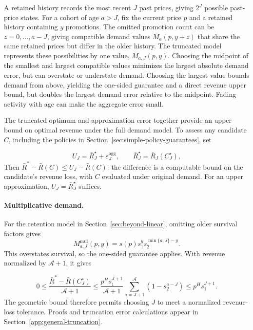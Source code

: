 \begingroup\color{black}
A retained history records the most recent \(J\) past prices, giving \(2^J\) possible past-price states. For a cohort of age \(a>J\), fix the current price \(p\) and a retained history containing \(y\) promotions. The omitted promotion count can be \(z=0,\ldots,a-J\), giving compatible demand values \(M_a(p,y+z)\) that share the same retained prices but differ in the older history. The truncated model represents these possibilities by one value, \(M_{a,J}(p,y)\). Choosing the midpoint of the smallest and largest compatible values minimizes the largest absolute demand error, but can overstate or understate demand. Choosing the largest value bounds demand from above, yielding the one-sided guarantee and a direct revenue upper bound, but doubles the largest demand error relative to the midpoint. Fading activity with age can make the aggregate error small.
\par\endgroup

\begingroup\color{black}
The truncated optimum and approximation error together provide an upper bound on optimal revenue under the full demand model. To assess any candidate \(C\), including the policies in Section~\ref{sec:simple-policy-guarantees}, set
\par\endgroup
\[
 U_J=\bar R_J^\star+\varepsilon_J^{\mathrm{agg}},
 \qquad \bar R_J^\star=\bar R_J(C_J^\star),
\]
\begingroup\color{black}
Then \(\bar R^*-\bar R(C)\le U_J-\bar R(C)\): the difference is a computable bound on the candidate's revenue loss, with \(C\) evaluated under original demand. For an upper approximation, \(U_J=\bar R_J^\star\) suffices.
\par\endgroup

\paragraph{Multiplicative demand.}
For the retention model in Section~\ref{sec:beyond-linear}, omitting older survival factors gives
\[
 M_{a,J}^{\mathrm{mul}}(p,y)
 =s(p)s_1^ys_2^{\min\{a,J\}-y}.
\]
\begingroup\color{black}
This overstates survival, so the one-sided guarantee applies. With revenue normalized by \(\mathcal A+1\), it gives
\par\endgroup
\begin{equation}\label{eq:multiplicative-truncation}
 0\le\frac{\bar R^*-\bar R(C_J^\star)}{\mathcal A+1}
 \le\frac{p^Hs_1^{J+1}}{\mathcal A+1}
 \sum_{a=J+1}^{\mathcal A}(1-s_2^{a-J})
 \le p^Hs_1^{J+1}.
\end{equation}
The geometric bound therefore permits choosing \(J\) to meet a normalized revenue-loss tolerance. Proofs and truncation error calculations appear in Section~\ref{app:general-truncation}.
\FloatBarrier
\par\endgroup
